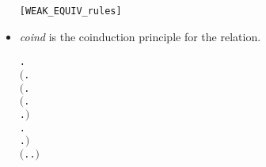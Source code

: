 \begin{itemize}
\begin{alltt}
        \HOLSymConst{\HOLTokenWeakEQ} \hfill{[WEAK_EQUIV_rules]}
\end{alltt}
\item \emph{coind} is the coinduction principle for the relation.
\begin{alltt}
\HOLTokenTurnstile{} \HOLSymConst{\HOLTokenForall{}}.
       \ensuremath{(}\HOLSymConst{\HOLTokenForall{}} .
               \HOLSymConst{\HOLTokenImp{}}
            \ensuremath{(}\HOLSymConst{\HOLTokenForall{}}.
                 \ensuremath{(}\HOLSymConst{\HOLTokenForall{}}.
                       \HOLTokenTransBegin{} \HOLTokenTransEnd {} \HOLSymConst{\HOLTokenImp{}}
                      \HOLSymConst{\HOLTokenExists{}}.  \HOLTokenWeakTransBegin{} \HOLTokenWeakTransEnd {} \HOLSymConst{\HOLTokenConj{}}   \ensuremath{)} \HOLSymConst{\HOLTokenConj{}}
                 \HOLSymConst{\HOLTokenForall{}}.
                      \HOLTokenTransBegin{} \HOLTokenTransEnd {} \HOLSymConst{\HOLTokenImp{}}
                     \HOLSymConst{\HOLTokenExists{}}.  \HOLTokenWeakTransBegin{} \HOLTokenWeakTransEnd {} \HOLSymConst{\HOLTokenConj{}}   \ensuremath{)} \HOLSymConst{\HOLTokenConj{}}
            \ensuremath{(}\HOLSymConst{\HOLTokenForall{}}.  \HOLTokenTransBegin\HOLSymConst{\ensuremath{\tau}}\HOLTokenTransEnd {} \HOLSymConst{\HOLTokenImp{}} \HOLSymConst{\HOLTokenExists{}}.  \HOLSymConst{\HOLTokenEPS}  \HOLSymConst{\HOLTokenConj{}}   \ensuremath{)} \HOLSymConst{\HOLTokenConj{}}

\end{alltt}
\end{itemize}
